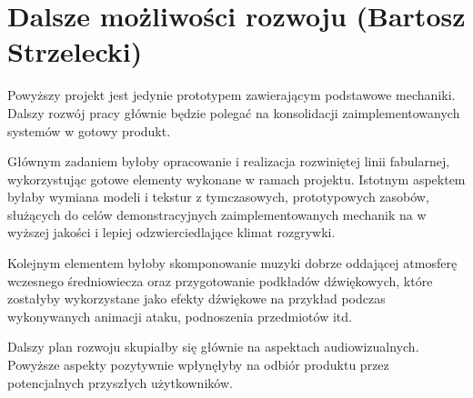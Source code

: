 \section{Dalsze możliwości rozwoju (Bartosz Strzelecki)}\label{s:dalsze}
Powyższy projekt jest jedynie prototypem zawierającym podstawowe mechaniki.
Dalszy rozwój pracy głównie będzie polegać na konsolidacji zaimplementowanych
systemów w gotowy produkt.

Głównym zadaniem byłoby opracowanie i realizacja rozwiniętej linii fabularnej,
wykorzystując gotowe elementy wykonane w ramach projektu. Istotnym aspektem
byłaby wymiana  modeli i tekstur z tymczasowych, prototypowych zasobów, służących
do celów demonstracyjnych zaimplementowanych mechanik na w wyższej jakości
i lepiej odzwierciedlające klimat rozgrywki.

Kolejnym elementem byłoby skomponowanie muzyki dobrze oddającej atmosferę wczesnego
średniowiecza oraz przygotowanie podkładów dźwiękowych, które zostałyby wykorzystane
jako efekty dźwiękowe na przykład podczas wykonywanych animacji ataku, podnoszenia przedmiotów itd.

Dalszy plan rozwoju skupiałby się głównie na aspektach audiowizualnych.
Powyższe aspekty pozytywnie wpłynęłyby na odbiór produktu przez potencjalnych przyszłych
użytkowników. 
